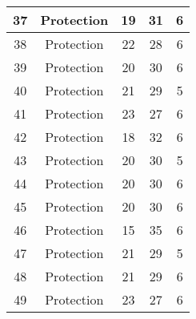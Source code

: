 \documentclass[results.tex]{subfiles}
\begin{document}
\begin{center}
\begin{tabular}{| c || c | c | c | c |}
            \hline
            37                      & Protection                   & 19                     & 31                      & 6                    \\
            \hline
            38                      & Protection                   & 22                     & 28                      & 6                    \\
            \hline
            39                      & Protection                   & 20                     & 30                      & 6                    \\
            \hline
            40                      & Protection                   & 21                     & 29                      & 5                    \\
            \hline
            41                      & Protection                   & 23                     & 27                      & 6                    \\
            \hline
            42                      & Protection                   & 18                     & 32                      & 6                    \\
            \hline
            43                      & Protection                   & 20                     & 30                      & 5                    \\
            \hline
            44                      & Protection                   & 20                     & 30                      & 6                    \\
            \hline
            45                      & Protection                   & 20                     & 30                      & 6                    \\
            \hline
            46                      & Protection                   & 15                     & 35                      & 6                    \\
            \hline
            47                      & Protection                   & 21                     & 29                      & 5                    \\
            \hline
            48                      & Protection                   & 21                     & 29                      & 6                    \\
            \hline
            49                      & Protection                   & 23                     & 27                      & 6                    \\
            \hline
        \end{tabular}
    \end{center}
\end{document}
